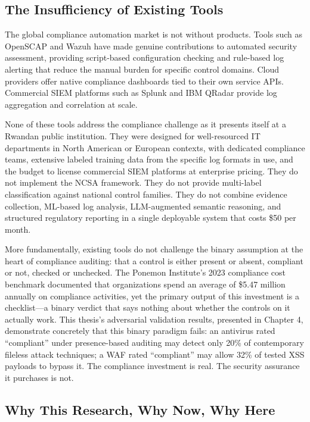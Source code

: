 \documentclass[12pt,oneside]{report}
\begin{document}
\subsection{The Insufficiency of Existing Tools}

The global compliance automation market is not without products. Tools such as OpenSCAP \cite{openscap} and Wazuh \cite{wazuh_ref} have made genuine contributions to automated security assessment, providing script-based configuration checking and rule-based log alerting that reduce the manual burden for specific control domains. Cloud providers offer native compliance dashboards tied to their own service APIs. Commercial SIEM platforms such as Splunk and IBM QRadar provide log aggregation and correlation at scale.

None of these tools address the compliance challenge as it presents itself at a Rwandan public institution. They were designed for well-resourced IT departments in North American or European contexts, with dedicated compliance teams, extensive labeled training data from the specific log formats in use, and the budget to license commercial SIEM platforms at enterprise pricing. They do not implement the NCSA framework. They do not provide multi-label classification against national control families. They do not combine evidence collection, ML-based log analysis, LLM-augmented semantic reasoning, and structured regulatory reporting in a single deployable system that costs \$50 per month.

More fundamentally, existing tools do not challenge the binary assumption at the heart of compliance auditing: that a control is either present or absent, compliant or not, checked or unchecked. The Ponemon Institute's 2023 compliance cost benchmark \cite{ponemon_cost} documented that organizations spend an average of \$5.47 million annually on compliance activities, yet the primary output of this investment is a checklist—a binary verdict that says nothing about whether the controls on it actually work. This thesis's adversarial validation results, presented in Chapter 4, demonstrate concretely that this binary paradigm fails: an antivirus rated ``compliant'' under presence-based auditing may detect only 20\% of contemporary fileless attack techniques; a WAF rated ``compliant'' may allow 32\% of tested XSS payloads to bypass it. The compliance investment is real. The security assurance it purchases is not.

\subsection{Why This Research, Why Now, Why Here}
\end{document}
